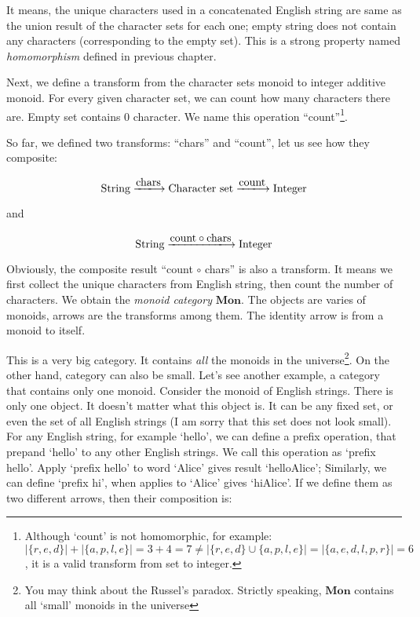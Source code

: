 \documentclass{article}
\begin{document}
It means, the unique characters used in a concatenated English string are same as the union result of the character sets for each one; empty string does not contain any characters (corresponding to the empty set). This is a strong property named {\em homomorphism} defined in previous chapter.

Next, we define a transform from the character sets monoid to integer additive monoid. For every given character set, we can count how many characters there are. Empty set contains 0 character. We name this operation ``count''\footnote{Although `count' is not homomorphic, for example: $|\{r, e, d\}| + |\{a, p, l, e\}| = 3 + 4 = 7 \neq |\{r, e, d\} \cup \{a, p, l, e\}| = |\{a, e, d, l, p, r\}| = 6$, it is a valid transform from set to integer.}.

So far, we defined two transforms: ``chars'' and ``count'', let us see how they composite:

\[
\text{String} \arrowto{\text{chars}} \text{Character set} \arrowto{\text{count}} \text{Integer}
\]

and

\[
\text{String} \arrowto{\text{count} \circ \text{chars}} \text{Integer}
\]

Obviously, the composite result ``count $\circ$ chars'' is also a transform. It means we first collect the unique characters from English string, then count the number of characters. We obtain the {\em monoid category} $\pmb{Mon}$. The objects are varies of monoids, arrows are the transforms among them. The identity arrow is from a monoid to itself.

This is a very big category. It contains {\em all} the monoids in the universe\footnote{You may think about the Russel's paradox. Strictly speaking, $\pmb{Mon}$ contains all `small' monoids in the universe}. On the other hand, category can also be small. Let's see another example, a category that contains only one monoid. Consider the monoid of English strings. There is only one object. It doesn't matter what this object is. It can be any fixed set, or even the set of all English strings (I am sorry that this set does not look small). For any English string, for example `hello', we can define a prefix operation, that prepand `hello' to any other English strings. We call this operation as `prefix hello'. Apply `prefix hello' to word `Alice' gives result `helloAlice'; Similarly, we can define `prefix hi', when applies to `Alice' gives `hiAlice'. If we define them as two different arrows, then their composition is:
\end{document}
